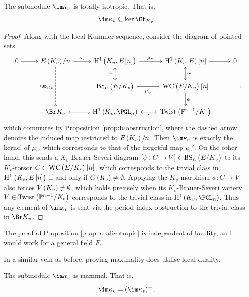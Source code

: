 \begin{proposition}
\label{prop:localisotropic}
The submodule $ \im \kappa_v $ is totally isotropic. That is,
$$ \im \kappa_v \subseteq \ker \Ob_{K_v}. $$
\end{proposition}

\begin{proof}
Along with the local Kummer sequence, consider the diagram of pointed sets
$$
\begin{tikzcd}
0 \arrow{r} & \En{K_v} \arrow{r}{\kappa_v} \arrow[dashed]{dd}[swap]{\Ob_{K_v}} & \HE[n]{K_v} \arrow{r}{\mu_v} \arrow[leftrightarrow]{d}[swap]{\sim} & \HE{K_v}\sbr{n} \arrow{r} \arrow[leftrightarrow]{d}{\sim} & 0 \\
& & \BS{K_v} \arrow{r}[swap]{\mu_v'} & \WC{K_v}\sbr{n} \arrow{d}{\phi} & \\
& \Br K_v & \H^1\br{K_v, \PGL_n} \arrow[hookrightarrow]{l} & \Twist{\PP^{n - 1}}{K_v} \arrow[leftrightarrow]{l}{\sim} &
\end{tikzcd},
$$
which commutes by Proposition \ref{prop:bsobstruction}, where the dashed arrow denotes the induced map restricted to $ \En{K_v} $. Then $ \im \kappa_v $ is exactly the kernel of $ \mu_v $, which corresponds to that of the forgetful map $ \mu_v' $. On the other hand, this sends a $ K_v $-Brauer-Severi diagram $ \sbr{\phi : C \to V} \in \BS{K_v} $ to its $ K_v $-torsor $ C \in \WC{K_v}\sbr{n} $, which corresponds to the trivial class in $ \HE[n]{K_v} $ if and only if $ C\br{K_v} \ne \emptyset $. Applying the $ K_v $-morphism $ \phi : C \to V $ also forces $ V\br{K_v} \ne \emptyset $, which holds precisely when its $ K_v $-Brauer-Severi variety $ V \in \Twist{\PP^{n - 1}}{K_v} $ corresponds to the trivial class in $ \H^1\br{K_v, \PGL_n} $. Thus any element of $ \im \kappa_v $ is sent via the period-index obstruction to the trivial class in $ \Br K_v $.
\end{proof}

\begin{remark}
The proof of Proposition \ref{prop:localisotropic} is independent of locality, and would work for a general field $ F $.
\end{remark}

In a similar vein as before, proving maximality does utilise local duality.

\begin{proposition}
\label{prop:localmaximal}
The submodule $ \im \kappa_v $ is maximal. That is,
$$ \im \kappa_v = \br{\im \kappa_v}^\perp. $$
\end{proposition}

